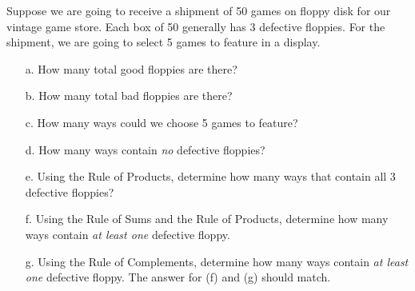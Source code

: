     \begin{questionNOGRADE}{\thequestion}
        Suppose we are going to receive a shipment of 50 games on floppy disk for our vintage game store.
        Each box of 50 generally has 3 defective floppies.
        For the shipment, we are going to select 5 games to feature in a display.

        \begin{enumerate}
            \item[a.]   How many total good floppies are there?
            \item[b.]   How many total bad floppies are there?
            \item[c.]   How many ways could we choose 5 games to feature?
            
            \item[d.]   How many ways contain \textit{no} defective floppies?
            
            \item[e.]   Using the Rule of Products, determine how many ways that contain all 3 defective floppies?
                    
            \item[f.]   Using the Rule of Sums and the Rule of Products, determine
                        how many ways contain \textit{at least one} defective floppy.

            \item[g.]   Using the Rule of Complements, determine
                        how many ways contain \textit{at least one} defective floppy.
                        The answer for (f) and (g) should match.
        \end{enumerate}
        
    \end{questionNOGRADE}

    \hrulefill

